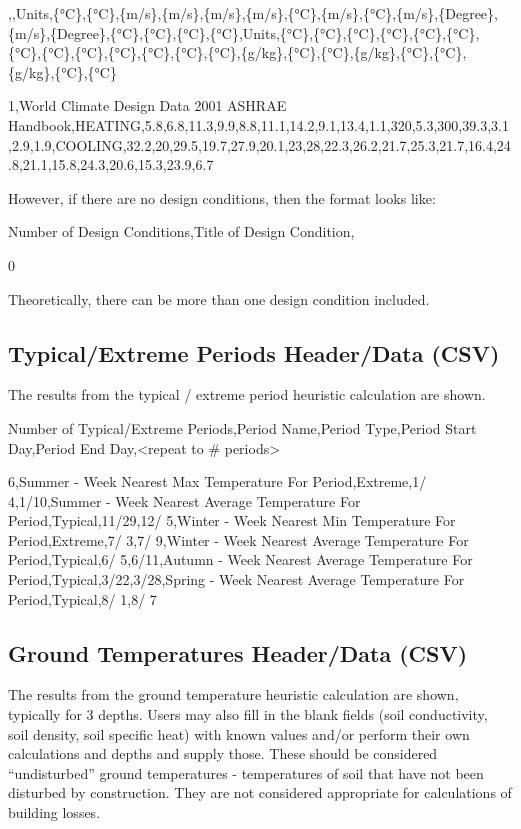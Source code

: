 ,,Units,\{°C\},\{°C\},\{m/s\},\{m/s\},\{m/s\},\{m/s\},\{°C\},\{m/s\},\{°C\},\{m/s\},\{Degree\},\{m/s\},\{Degree\},\{°C\},\{°C\},\{°C\},\{°C\},Units,\{°C\},\{°C\},\{°C\},\{°C\},\{°C\},\{°C\},\{°C\},\{°C\},\{°C\},\{°C\},\{°C\},\{°C\},\{°C\},\{g/kg\},\{°C\},\{°C\},\{g/kg\},\{°C\},\{°C\},\{g/kg\},\{°C\},\{°C\}

1,World Climate Design Data 2001 ASHRAE Handbook,HEATING,5.8,6.8,11.3,9.9,8.8,11.1,14.2,9.1,13.4,1.1,320,5.3,300,39.3,3.1,2.9,1.9,COOLING,32.2,20,29.5,19.7,27.9,20.1,23,28,22.3,26.2,21.7,25.3,21.7,16.4,24.8,21.1,15.8,24.3,20.6,15.3,23.9,6.7

However, if there are no design conditions, then the format looks like:

Number of Design Conditions,Title of Design Condition,

0

Theoretically, there can be more than one design condition included.

\subsection{Typical/Extreme Periods Header/Data (CSV)}\label{typicalextreme-periods-headerdata-csv}

The results from the typical / extreme period heuristic calculation are shown.

Number of Typical/Extreme Periods,Period Name,Period Type,Period Start Day,Period End Day,\textless{}repeat to \# periods\textgreater{}

6,Summer - Week Nearest Max Temperature For Period,Extreme,1/ 4,1/10,Summer - Week Nearest Average Temperature For Period,Typical,11/29,12/ 5,Winter - Week Nearest Min Temperature For Period,Extreme,7/ 3,7/ 9,Winter - Week Nearest Average Temperature For Period,Typical,6/ 5,6/11,Autumn - Week Nearest Average Temperature For Period,Typical,3/22,3/28,Spring - Week Nearest Average Temperature For Period,Typical,8/ 1,8/ 7

\subsection{Ground Temperatures Header/Data (CSV)}\label{ground-temperatures-headerdata-csv}

The results from the ground temperature heuristic calculation are shown, typically for 3 depths. Users may also fill in the blank fields (soil conductivity, soil density, soil specific heat) with known values and/or perform their own calculations and depths and supply those. These should be considered ``undisturbed'' ground temperatures - temperatures of soil that have not been disturbed by construction. They are not considered appropriate for calculations of building losses.

